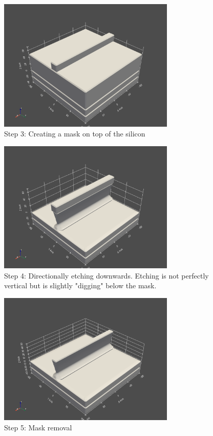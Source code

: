 \begin{figure}[H]
	\centering
	\includegraphics[width=0.75\textwidth]{res/task3_3_mask_cration.png}
	\caption{Step 3: Creating a mask on top of the silicon}
\end{figure}

\begin{figure}[H]
	\centering
	\includegraphics[width=0.75\textwidth]{res/task3_4_fin_creation.png}
	\caption{Step 4: Directionally etching downwards. Etching is not perfectly vertical but is slightly "digging" below the mask.}
    \label{ffig:fin-creation}
\end{figure}

\begin{figure}[H]
	\centering
	\includegraphics[width=0.75\textwidth]{res/task3_5_maskRemoval.png}
	\caption{Step 5: Mask removal}
\end{figure}


